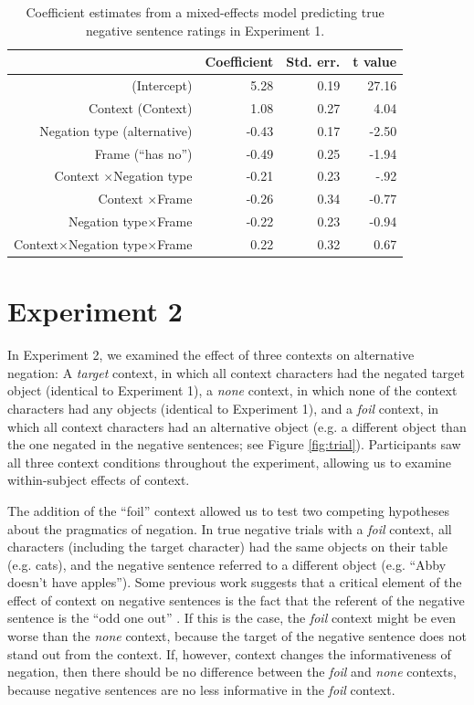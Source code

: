 \documentclass[10pt,letterpaper]{article}
\begin{document}
\begin{table}[t]
\caption{\label{tab:s1} Coefficient estimates from a mixed-effects model predicting true negative sentence ratings in Experiment 1.}
\begin{center}
\small\addtolength{\tabcolsep}{-5pt}
\begin{tabular}{rrrr}
  \hline
 & Coefficient & Std. err. & t value \\ 
  \hline
(Intercept) & 5.28 & 0.19 & 27.16 \\ 
  Context (Context) & 1.08 & 0.27 & 4.04  \\ 
  Negation type (alternative) & -0.43 & 0.17 & -2.50 \\
  Frame (``has no'') & -0.49 & 0.25 & -1.94 \\ 
  Context $\times$Negation type & -0.21 & 0.23 & -.92 \\
  Context $\times$Frame & -0.26 & 0.34 & -0.77 \\
  Negation type$\times$Frame & -0.22 & 0.23 & -0.94 \\
  Context$\times$Negation type$\times$Frame & 0.22 & 0.32 & 0.67 \\
   \hline
\end{tabular}
\end{center}
\end{table}

\section{Experiment 2}

In Experiment 2, we examined the effect of three contexts on alternative negation: A \emph{target} context, in which all context characters had the negated target object (identical to Experiment 1), a \emph{none} context, in which none of the context characters had any objects (identical to Experiment 1), and a \emph{foil} context, in which all context characters had an alternative object (e.g. a different object than the one negated in the negative sentences; see Figure \ref{fig:trial}).  Participants saw all three context conditions throughout the experiment, allowing us to examine within-subject effects of context.  

The addition of the ``foil'' context allowed us to test two competing hypotheses about the pragmatics of negation.  In true negative trials with a \emph{foil} context, all characters (including the target character) had the same objects on their table (e.g. cats), and the negative sentence referred to a different object (e.g. ``Abby doesn't have apples'').  Some previous work suggests that a critical element of the effect of context on negative sentences is the fact that the referent of the negative sentence is the ``odd one out'' \cite{wason1965}.  If this is the case, the \emph{foil} context might be even worse than the \emph{none} context, because the target of the negative sentence does not stand out from the context.  If, however, context changes the informativeness of negation, then there should be no difference between the \emph{foil} and \emph{none} contexts, because negative sentences are no less informative in the \emph{foil} context.  
\end{document}
